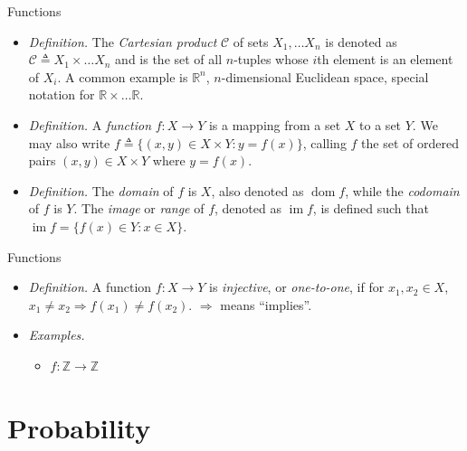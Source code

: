 \documentclass{beamer}
\begin{document}
\begin{frame}{Functions}
    \begin{itemize}
        \item
        \textit{Definition.} The \textit{Cartesian product} $ \mathcal{C} $ of
        sets $ X_1, \ldots X_n $ is denoted as $ \mathcal{C} \triangleq
        X_1 \times \ldots X_n $ and is the set of all $ n $-tuples whose
        $ i $th element is an element of $ X_i $. A common example is
        $\mathbb{R}^n $, $ n $-dimensional Euclidean space, special notation
        for $ \mathbb{R} \times \ldots \mathbb{R} $.

        \item
        \textit{Definition.} A \textit{function} $ f : X \rightarrow Y $ is a
        mapping from a set $ X $ to a set $ Y $. We may also write
        $ f \triangleq \{(x, y) \in X \times Y : y = f(x)\} $, calling $ f $
        the set of ordered pairs $ (x, y) \in X \times Y $ where $ y = f(x) $.

        \item
        \textit{Definition.} The \textit{domain} of $ f $ is $ X $, also
        denoted as $ \operatorname{dom} f $, while the \textit{codomain} of
        $ f $ is $ Y $. The \textit{image} or \textit{range} of $ f $, denoted
        as $ \operatorname{im} f $, is defined such that
        $ \operatorname{im} f = \{f(x) \in Y : x \in X\} $.
    \end{itemize}
\end{frame}

\begin{frame}{Functions}
    \begin{itemize}
        \item
        \textit{Definition.} A function $ f : X \rightarrow Y $ is
        \textit{injective}, or \textit{one-to-one}, if for $ x_1, x_2 \in X $,
        $ x_1 \ne x_2 \Rightarrow f(x_1) \ne f(x_2) $. $ \Rightarrow $ means
        ``implies''.

        \item
        \textit{Examples.}
        \begin{itemize}
            \item
            $ f : \mathbb{Z} \rightarrow \mathbb{Z} $
        \end{itemize}
    \end{itemize}
\end{frame}

\section{Probability}
\end{document}
